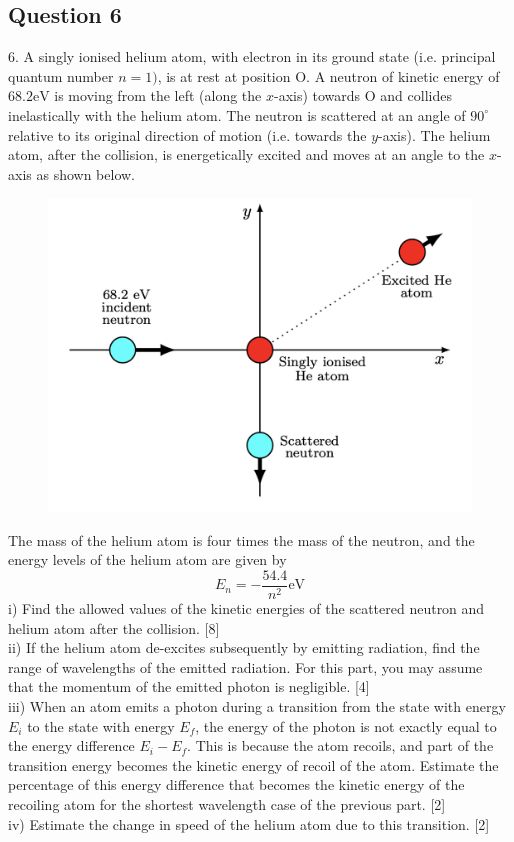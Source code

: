 \documentclass{article}
\begin{document}
\subsection{Question 6}
6. A singly ionised helium atom, with electron in its ground state (i.e. principal quantum number $n=1)$, is at rest at position $\mathrm{O}$. A neutron of kinetic energy of $68.2 \mathrm{eV}$ is moving from the left (along the $x$-axis) towards $\mathrm{O}$ and collides inelastically with the helium atom. The neutron is scattered at an angle of $90^{\circ}$ relative to its original direction of motion (i.e. towards the $y$-axis). The helium atom, after the collision, is energetically excited and moves at an angle to the $x$-axis as shown below.

\begin{figure}
	\centering
	\includegraphics[width=0.5\linewidth]{spho_book_TYS_images/2018q6.png}
	\caption{}
\end{figure}

The mass of the helium atom is four times the mass of the neutron, and the energy levels of the helium atom are given by
$$
E_{n}=-\frac{54.4}{n^{2}} \mathrm{eV}
$$
i) Find the allowed values of the kinetic energies of the scattered neutron and helium atom after the collision. [8] \\
ii) If the helium atom de-excites subsequently by emitting radiation, find the range of wavelengths of the emitted radiation. For this part, you may assume that the momentum of the emitted photon is negligible. [4] \\
iii) When an atom emits a photon during a transition from the state with energy $E_{i}$ to the state with energy $E_{f}$, the energy of the photon is not exactly equal to the energy difference $E_{i}-E_{f}$. This is because the atom recoils, and part of the transition energy becomes the kinetic energy of recoil of the atom. Estimate the percentage of this energy difference that becomes the kinetic energy of the recoiling atom for the shortest wavelength case of the previous part. [2] \\
iv) Estimate the change in speed of the helium atom due to this transition. [2]
\end{document}
